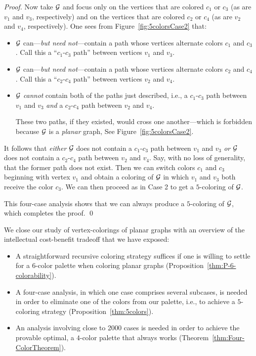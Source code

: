 \begin{proof}
Now take $\mbox{$\cal G$}$ and focus only on the vertices that are colored $c_1$ or $c_3$ (as are $v_1$ and $v_3$, respectively) and on the vertices that are colored $c_2$ or $c_4$ (as are $v_2$ and $v_4$, respectively).  One sees from Figure~\ref{fig:5colorsCase2} that:
\begin{itemize}
\item
$\mbox{$\cal G$}$ can---{\em but need not}---contain a path whose vertices alternate  colors $c_1$ and $c_3$. Call this a ``$c_1$-$c_3$ path'' between vertices $v_1$ and $v_3$.
\medskip\item
$\mbox{$\cal G$}$ can---{\em but need not}---contain a path whose vertices alternate colors $c_2$ and $c_4$.  Call this a ``$c_2$-$c_4$ path'' between vertices $v_2$ and $v_4$.
\medskip\item
$\mbox{$\cal G$}$ {\em cannot} contain both of the paths just described, i.e., a $c_1$-$c_3$ path between $v_1$ and $v_3$ {\em and} a $c_2$-$c_4$ path between $v_2$ and $v_4$.

\smallskip

These two paths, if they existed, would cross one another---which is forbidden because $\mbox{$\cal G$}$ is a {\em planar} graph,  See Figure~\ref{fig:5colorsCase2}.


\end{itemize}
It follows that {\em either} $\mbox{$\cal G$}$ does not contain a $c_1$-$c_3$ path between $v_1$ and $v_3$ {\em or} $\mbox{$\cal G$}$ does not contain a $c_2$-$c_4$ path between $v_2$ and $v_4$.  Say, with no loss of generality, that the former path does not exist.  Then we can switch colors $c_1$ and $c_3$ beginning with vertex $v_1$ and obtain a coloring of $\mbox{$\cal G$}$ in which $v_1$ and $v_3$ both receive the color $c_3$.  We can then proceed as in Case 2 to get a $5$-coloring of $\mbox{$\cal G$}$.

\smallskip

This four-case analysis shows that we can always produce a $5$-coloring of $\mbox{$\cal G$}$, which completes the proof.  \qed
\end{proof}

\bigskip

We close our study of vertex-colorings of planar graphs with an overview of the intellectual cost-benefit tradeoff that we have exposed:
\begin{itemize}
\item
A straightforward recursive coloring strategy suffices if one is willing to settle for a $6$-color palette when coloring planar graphs (Proposition~\ref{thm:P-6-colorability}).
\medskip\item
A four-case analysis, in which one case comprises several subcases, is needed in order to eliminate one of the colors from our palette, i.e., to achieve a $5$-coloring strategy (Proposition~\ref{thm:5colors}).
\medskip\item
An analysis involving close to 2000 cases is needed in order to achieve the provable optimal, a $4$-color palette that always works (Theorem~\ref{thm:Four-ColorTheorem}).
\end{itemize}

